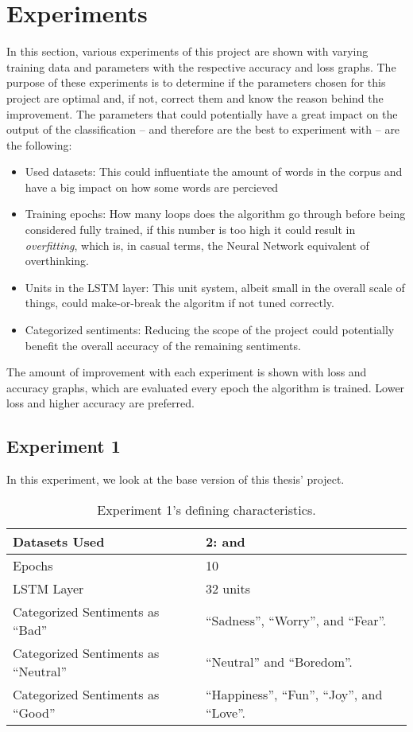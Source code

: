 \section{Experiments}
In this section, various experiments of this project are shown with varying training data and parameters with the respective accuracy and loss graphs.
The purpose of these experiments is to determine if the parameters chosen for this project are optimal and, if not, correct them and know the reason behind the improvement.
The parameters that could potentially have a great impact on the output of the classification -- and therefore are the best to experiment with -- are the following:
\begin{itemize}
	\item Used datasets: This could influentiate the amount of words in the corpus and have a big impact on how some words are percieved
	\item Training epochs: How many loops does the algorithm go through before being considered fully trained, if this number is too high it could result in \textit{overfitting}, which is, in casual terms, the Neural Network equivalent of overthinking.
	\item Units in the LSTM layer: This unit system, albeit small in the overall scale of things, could make-or-break the algoritm if not tuned correctly.
	\item Categorized sentiments: Reducing the scope of the project could potentially benefit the overall accuracy of the remaining sentiments.
\end{itemize}
The amount of improvement with each experiment is shown with loss and accuracy graphs, which are evaluated every epoch the algorithm is trained. Lower loss and higher accuracy are preferred.
\subsection{Experiment 1}
In this experiment, we look at the base version of this thesis' project.
\begin{table}[!th]
	\caption{Experiment 1's defining characteristics.}
	\vspace{0.5cm}
	\centering
	\begin{tabular}[t]{|l|l|}
	\hline
		Datasets Used & 2: \citet{d1} and \citet{d2}
	\\ \hline
		Epochs & 10
	\\ \hline
		LSTM Layer & 32 units
	\\ \hline
		Categorized Sentiments as ``Bad'' & ``Sadness'', ``Worry'', and ``Fear''.
	\\ \hline	
		 Categorized Sentiments as ``Neutral'' & ``Neutral'' and ``Boredom''.
	\\ \hline	
		Categorized Sentiments as ``Good'' & ``Happiness'', ``Fun'', ``Joy'', and ``Love''.
	\\ \hline
	\end{tabular}
\end{table}

